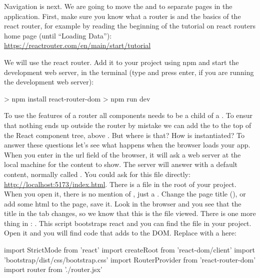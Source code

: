 \documentclass[fleqn, article, a4paper]{memoir}
\begin{document}
\begin{Assignments}
\item Navigation is next. We are going to move the  and  to separate pages in the application. First, make sure you know what a router is and the basics of the react router, for example by reading the beginning of the tutorial on react routers home page (until ``Loading Data''): 
\\ \url{https://reactrouter.com/en/main/start/tutorial}

\item We will use the react router. Add it to your project using npm and start the development web server, in the terminal (type  and press enter, if you are running the development web server):
\begin{Code}
> npm install react-router-dom
> npm run dev
\end{Code}

\item To use the features of a router all components needs to be a child of a . To ensur that nothing ends up outside the router by mistake we can add the  to the top of the React component tree, above . But where is that? How is  instantiated? To answer these questions let's see what happens when the browser loads your app. When you enter  in the url field of the browser, it will ask a web server at the local machine for the content to show. The server will answer with a default content, normally called . You could ask for this file directly: \url{http://localhost:5173/index.html}. There is a  file in the root of your project. When you open it, there is no mention of , just a . Change the page title (), or add some html to the page, save it. Look in the browser and you see that the title in the tab changes, so we know that this is the file viewed. There is one more thing in : . This script bootstraps react and you can find the file in your project. Open it and you will find code that adds  to the DOM. Replace  with a  here:
\begin{Code}
import { StrictMode } from 'react'
import { createRoot } from 'react-dom/client'
import 'bootstrap/dist/css/bootstrap.css'
import { RouterProvider } from 'react-router-dom'
import router from './router.jsx'


\end{Code}
\end{Assignments}
\end{document}

